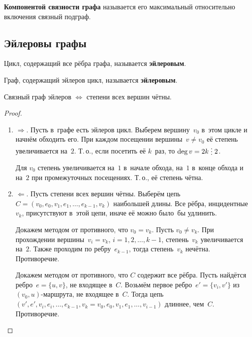  \textbf{Компонентой связности графа} называется его максимальный относительно включения связный подграф.

\subsection{Эйлеровы графы}
Цикл, содержащий все рёбра графа, называется \textbf{эйлеровым}.

 Граф, содержащий эйлеров цикл, называется \textbf{эйлеровым}.

\begin{theorem}
Связный граф эйлеров $\Leftrightarrow$ степени всех вершин чётны.
\end{theorem}
\begin{proof}
\begin{enumerate}
	\item $\Rightarrow$. Пусть в~графе есть эйлеров цикл.
	Выберем вершину~$v_0$ в~этом цикле и начнём обходить его.
	При каждом посещении вершины~$v \neq v_0$ её степень увеличивается на~$2$.
	Т.\,о., если посетить её $k$~раз, то $\deg v = 2k \mult 2$.
	
	Для $v_0$ степень увеличивается на~$1$ в~начале обхода, на~$1$ в~конце обхода и на~$2$ при промежуточных посещениях.
	Т.\,о., её степень чётна.
	
	\item $\Leftarrow$. Пусть степени всех вершин чётны.
	Выберём цепь~$C = (v_0, e_0, v_1, e_1, \ldots, e_{k-1}, v_k)$ наибольшей длины.
	Все рёбра, инцидентные~$v_k$, присутствуют в~этой цепи, иначе её можно было~бы удлинить.
	
	Докажем методом от противного, что $v_0 = v_k$.
	Пусть $v_0 \neq v_k$.
	При прохождении вершины~$v_i = v_k$, $i = 1, 2, \ldots, k - 1$, степень~$v_k$ увеличивается на~$2$.
	Также проходим по ребру~$e_{k-1}$, тогда степень~$v_k$ нечётна.
	Противоречие.
	
	Докажем методом от противного, что $C$ содержит все рёбра.	
	Пусть найдётся ребро~$e = \{ u, v \}$, не входящее в~$C$.
	Возьмём первое ребро~$e' = \{ v_i, v' \}$ из $(v_0, u)$-маршрута, не входящее в~$C$.
	Тогда цепь~$(v', e', v_i, e_i, \ldots, e_{k-1}, \allowbreak v_k = v_0, \allowbreak e_0, v_1, e_1, \ldots, v_{i-1})$ длиннее, чем~$C$.
	Противоречие.
\end{enumerate}
\end{proof}

